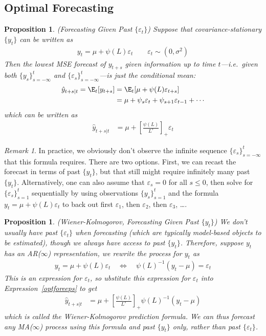 \documentclass[12pt]{article}
\theoremstyle{plain}
\newtheorem{prop}[thm]{Proposition}
\theoremstyle{definition}
\theoremstyle{remark}
\newtheorem*{rmk}{Remark}
\begin{document}
\clearpage
\subsection{Optimal Forecasting}

\begin{prop}\emph{(Forecasting Given Past $\{\varepsilon_t\}$)}
Suppose that covariance-stationary $\{y_t\}$ can be written as
\begin{align*}
  y_t = \mu + \psi(L)\varepsilon_t
  \qquad \varepsilon_t \sim (0,\sigma^2)
\end{align*}
Then the lowest MSE forecast of $y_{t+s}$ given information up to time
$t$---i.e.\ given both $\{y_s\}_{s=-\infty}^t$ and
$\{\varepsilon_s\}_{s=-\infty}^t$---is just the conditional mean:
\begin{align*}
  \hat{y}_{t+s|t}
  = \E_t[y_{t+s}]
  &= \E_t[\mu + \psi(L)\varepsilon_{t+s}] \\
  &= \mu + \psi_s\varepsilon_t + \psi_{s+1}\varepsilon_{t-1} + \cdots
\end{align*}
which can be written as
\begin{align}
  \hat{y}_{t+s|t}
  &= \mu + \left[\frac{\psi(L)}{L^s}\right]_+\varepsilon_t
  \label{optforeeps}
\end{align}
\end{prop}
\begin{rmk}
In practice, we obviously don't observe the infinite sequence
$\{\varepsilon_s\}_{s=-\infty}^t$ that this formula requires. There are
two options. First, we can recast the forecast in terms of past
$\{y_t\}$, but that still might require infinitely many past $\{y_t\}$.
Alternatively, one can also assume that $\varepsilon_s=0$ for all
$s\leq 0$, then solve for $\{\varepsilon_s\}_{s=1}^t$ sequentially by using
observations $\{y_s\}_{s=1}^t$ and the formula
$y_t = \mu + \psi(L)\varepsilon_t$ to back out first $\varepsilon_1$,
then $\varepsilon_2$, then $\varepsilon_3$, \ldots.
\end{rmk}


\begin{prop}\emph{(Wiener-Kolmogorov, Forecasting Given Past $\{y_t\}$)}
We don't usually have past $\{\varepsilon_t\}$ when forecasting (which
are typically model-based objects to be estimated), though we always
have access to past $\{y_t\}$. Therefore, suppose $y_t$ has an
AR($\infty$) representation, we rewrite the process for $y_t$ as
\begin{align*}
  y_t = \mu + \psi(L)\varepsilon_t
  \quad\iff\quad
  \psi(L)^{-1}(y_t - \mu) = \varepsilon_t
\end{align*}
This is an expression for $\varepsilon_t$, so ubstitute this expression
for $\varepsilon_t$ into Expression~\ref{optforeeps} to get
\begin{align}
  \hat{y}_{t+s|t}
  &= \mu + \left[\frac{\psi(L)}{L^s}\right]_+
  \psi(L)^{-1}(y_t - \mu)
  \label{wienerkolmogorov}
\end{align}
which is called the \emph{Wiener-Kolmogorov prediction formula}. We can
thus forecast any MA($\infty$) process using this formula and past
$\{y_t\}$ only, rather than past $\{\varepsilon_t\}$.
\end{prop}
\end{document}
